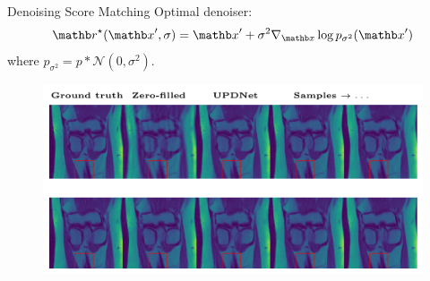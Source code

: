 \begin{frame}{Denoising Score Matching}
    Optimal denoiser:
    \begin{equation*}
        \rb^\star(\xb', \sigma) = \xb' + \sigma^2 \nabla_{\xb} \log p_{\sigma^2}(\xb')
    \end{equation*}
    where $p_{\sigma^2} = p \ast \mathcal{N}(0, \sigma^2)$.
    \begin{figure}
        \centering
        \includegraphics[width=\textwidth]{Figures/clinic_applic/dsm_main.pdf}
    \end{figure}
\end{frame}
